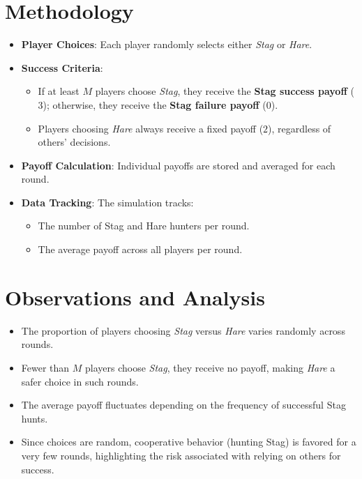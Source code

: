 \documentclass{article}
\begin{document}
\section{Methodology}
\begin{itemize}
\item \textbf{Player Choices}: Each player randomly selects either \textit{Stag} or \textit{Hare}.
\item \textbf{Success Criteria}:
\begin{itemize}
\item If at least $M$ players choose \textit{Stag}, they receive the \textbf{Stag success payoff} ($3$); otherwise, they receive the \textbf{Stag failure payoff} ($0$).
\item Players choosing \textit{Hare} always receive a fixed payoff ($2$), regardless of others' decisions.
\end{itemize}
\item \textbf{Payoff Calculation}: Individual payoffs are stored and averaged for each round.
\item \textbf{Data Tracking}: The simulation tracks:
\begin{itemize}
\item The number of Stag and Hare hunters per round.
\item The average payoff across all players per round.
\end{itemize}
\end{itemize}

\section{Observations and Analysis}
\begin{itemize}
\item The proportion of players choosing \textit{Stag} versus \textit{Hare} varies randomly across rounds.
\item Fewer than $M$ players choose \textit{Stag}, they receive no payoff, making \textit{Hare} a safer choice in such rounds.
\item The average payoff fluctuates depending on the frequency of successful Stag hunts.
\item Since choices are random, cooperative behavior (hunting Stag) is favored for a very few rounds, highlighting the risk associated with relying on others for success.
\end{itemize}
\end{document}
